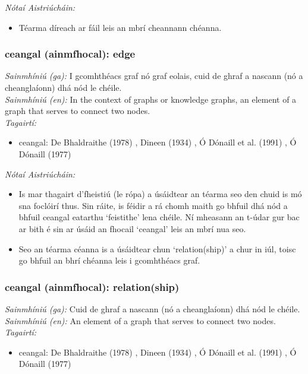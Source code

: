  \noindent \textit{Nótaí Aistriúcháin:}
\begin{itemize}
	\item Téarma díreach ar fáil leis an mbrí cheannann chéanna.
\end{itemize}


\subsubsection*{ceangal (ainmfhocal): edge}
 \noindent \textit{Sainmhíniú (ga):} I gcomhthéacs graf nó graf eolais, cuid de ghraf a nascann (nó a cheanglaíonn) dhá nód le chéile.
\\
 \noindent \textit{Sainmhíniú (en):} In the context of graphs or knowledge graphs, an element of a graph that serves to connect two nodes.
\\
 \noindent \textit{Tagairtí:}
\begin{itemize}
	\item ceangal: De Bhaldraithe (1978) \cite{de-bhaldraithe}, Dineen (1934) \cite{dineen}, Ó Dónaill et al. (1991) \cite{focloir-beag}, Ó Dónaill (1977) \cite{odonaill}
\end{itemize}

 \noindent \textit{Nótaí Aistriúcháin:}
\begin{itemize}
	\item Is mar thagairt d'fheistiú (le rópa) a úsáidtear an téarma seo den chuid is mó sna foclóirí thus. Sin ráite, is féidir a rá chomh maith go bhfuil dhá nód a bhfuil ceangal eatarthu `feistithe' lena chéile. Ní mheasann an t-údar gur bac ar bith é sin ar úsáid an fhocail `ceangal' leis an mbrí nua seo.
	\item Seo an téarma céanna is a úsáidtear chun `relation(ship)' a chur in iúl, toisc go bhfuil an bhrí chéanna leis i gcomhthéacs graf.
\end{itemize}


\subsubsection*{ceangal (ainmfhocal): relation(ship)}
 \noindent \textit{Sainmhíniú (ga):} Cuid de ghraf a nascann (nó a cheanglaíonn) dhá nód le chéile.
\\
 \noindent \textit{Sainmhíniú (en):} An element of a graph that serves to connect two nodes.
\\
 \noindent \textit{Tagairtí:}
\begin{itemize}
	\item ceangal: De Bhaldraithe (1978) \cite{de-bhaldraithe}, Dineen (1934) \cite{dineen}, Ó Dónaill et al. (1991) \cite{focloir-beag}, Ó Dónaill (1977) \cite{odonaill}
\end{itemize}

